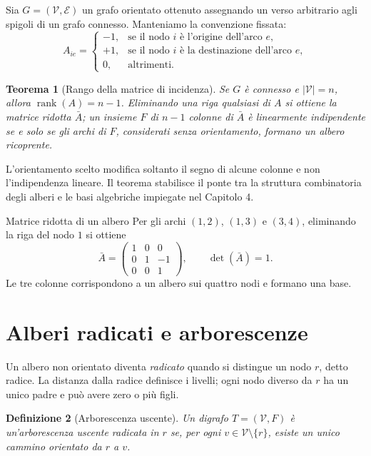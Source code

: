 \documentclass[11pt,a4paper]{article}
\newtheorem{definition}{Definizione}[section]
\newtheorem{theorem}[definition]{Teorema}
\newcommand{\V}{\mathcal{V}}
\newcommand{\E}{\mathcal{E}}
\begin{document}
Sia $G=(\V,\E)$ un grafo orientato ottenuto assegnando un verso arbitrario agli spigoli di un grafo connesso. Manteniamo la convenzione fissata:
\[
A_{ie}=\begin{cases}
-1,&\text{se il nodo $i$ è l'origine dell'arco $e$},\\
+1,&\text{se il nodo $i$ è la destinazione dell'arco $e$},\\
0,&\text{altrimenti.}
\end{cases}
\]

\begin{theorem}[Rango della matrice di incidenza]
Se $G$ è connesso e $|\V|=n$, allora $\operatorname{rank}(A)=n-1$. Eliminando una riga qualsiasi di $A$ si ottiene la matrice ridotta $\bar A$; un insieme $F$ di $n-1$ colonne di $\bar A$ è linearmente indipendente se e solo se gli archi di $F$, considerati senza orientamento, formano un albero ricoprente.
\end{theorem}

L'orientamento scelto modifica soltanto il segno di alcune colonne e non l'indipendenza lineare. Il teorema stabilisce il ponte tra la struttura combinatoria degli alberi e le basi algebriche impiegate nel Capitolo 4.

\begin{examplebox}{Matrice ridotta di un albero}
Per gli archi $(1,2)$, $(1,3)$ e $(3,4)$, eliminando la riga del nodo $1$ si ottiene
\[
\bar A=
\begin{pmatrix}
1&0&0\\
0&1&-1\\
0&0&1
\end{pmatrix},
\qquad \det(\bar A)=1.
\]
Le tre colonne corrispondono a un albero sui quattro nodi e formano una base.
\end{examplebox}

\section{Alberi radicati e arborescenze}

Un albero non orientato diventa \emph{radicato} quando si distingue un nodo $r$, detto radice. La distanza dalla radice definisce i livelli; ogni nodo diverso da $r$ ha un unico padre e può avere zero o più figli.

\begin{definition}[Arborescenza uscente]
Un digrafo $T=(\V,F)$ è un'\emph{arborescenza uscente} radicata in $r$ se, per ogni $v\in\V\setminus\{r\}$, esiste un unico cammino orientato da $r$ a $v$.
\end{definition}
\end{document}
